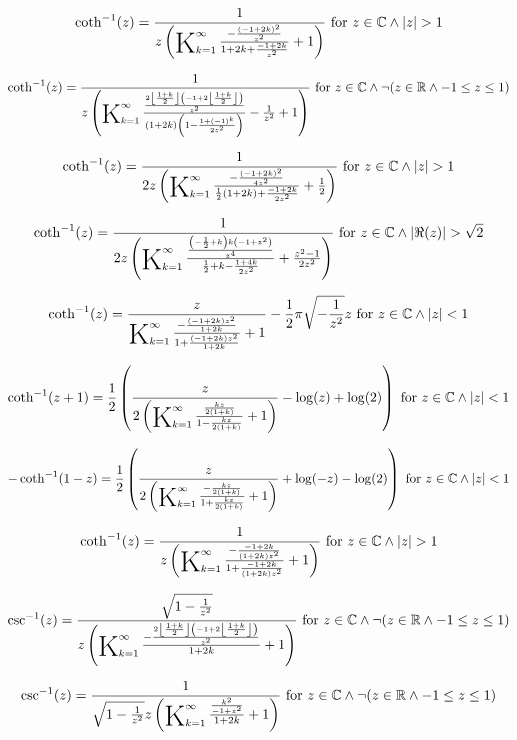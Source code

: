 \documentclass{article}
\newcommand{\bigK}{\mathop{\raisebox{-5pt}{\huge K}}}
\begin{document}
\[\coth ^{-1}(z)=\frac{1}{z \left(\bigK_{k=1}^{\infty}\frac{-\frac{(-1+2 k)^2}{z^2}}{1+2 k+\frac{-1+2 k}{z^2}}+1\right)}\text{ for }z\in \mathbb{C}\land \left| z\right| >1\] 

\[\coth ^{-1}(z)=\frac{1}{z \left(\bigK_{k=1}^{\infty}\frac{\frac{2 \left\lfloor \frac{1+k}{2}\right\rfloor  \left(-1+2 \left\lfloor \frac{1+k}{2}\right\rfloor \right)}{z^2}}{(1+2 k) \left(1-\frac{1+(-1)^k}{2 z^2}\right)}-\frac{1}{z^2}+1\right)}\text{ for }z\in \mathbb{C}\land \neg (z\in \mathbb{R}\land -1\leq z\leq 1)\] 

\[\coth ^{-1}(z)=\frac{1}{2 z \left(\bigK_{k=1}^{\infty}\frac{-\frac{(-1+2 k)^2}{4 z^2}}{\frac{1}{2} (1+2 k)+\frac{-1+2 k}{2 z^2}}+\frac{1}{2}\right)}\text{ for }z\in \mathbb{C}\land \left| z\right| >1\] 

\[\coth ^{-1}(z)=\frac{1}{2 z \left(\bigK_{k=1}^{\infty}\frac{\frac{\left(-\frac{1}{2}+k\right) k \left(-1+z^2\right)}{z^4}}{\frac{1}{2}+k-\frac{1+4 k}{2 z^2}}+\frac{z^2-1}{2 z^2}\right)}\text{ for }z\in \mathbb{C}\land \left| \Re(z)\right| >\sqrt{2}\] 

\[\coth ^{-1}(z)=\frac{z}{\bigK_{k=1}^{\infty}\frac{-\frac{(-1+2 k) z^2}{1+2 k}}{1+\frac{(-1+2 k) z^2}{1+2 k}}+1}-\frac{1}{2} \pi  \sqrt{-\frac{1}{z^2}} z\text{ for }z\in \mathbb{C}\land \left| z\right| <1\] 

\[\coth ^{-1}(z+1)=\frac{1}{2} \left(\frac{z}{2 \left(\bigK_{k=1}^{\infty}\frac{\frac{k z}{2 (1+k)}}{1-\frac{k z}{2 (1+k)}}+1\right)}-\log (z)+\log (2)\right)\text{ for }z\in \mathbb{C}\land \left| z\right| <1\] 

\[-\coth ^{-1}(1-z)=\frac{1}{2} \left(\frac{z}{2 \left(\bigK_{k=1}^{\infty}\frac{-\frac{k z}{2 (1+k)}}{1+\frac{k z}{2 (1+k)}}+1\right)}+\log (-z)-\log (2)\right)\text{ for }z\in \mathbb{C}\land \left| z\right| <1\] 

\[\coth ^{-1}(z)=\frac{1}{z \left(\bigK_{k=1}^{\infty}\frac{-\frac{-1+2 k}{(1+2 k) z^2}}{1+\frac{-1+2 k}{(1+2 k) z^2}}+1\right)}\text{ for }z\in \mathbb{C}\land \left| z\right| >1\] 

\[\csc ^{-1}(z)=\frac{\sqrt{1-\frac{1}{z^2}}}{z \left(\bigK_{k=1}^{\infty}\frac{-\frac{2 \left\lfloor \frac{1+k}{2}\right\rfloor  \left(-1+2 \left\lfloor \frac{1+k}{2}\right\rfloor \right)}{z^2}}{1+2 k}+1\right)}\text{ for }z\in \mathbb{C}\land \neg (z\in \mathbb{R}\land -1\leq z\leq 1)\] 

\[\csc ^{-1}(z)=\frac{1}{\sqrt{1-\frac{1}{z^2}} z \left(\bigK_{k=1}^{\infty}\frac{\frac{k^2}{-1+z^2}}{1+2 k}+1\right)}\text{ for }z\in \mathbb{C}\land \neg (z\in \mathbb{R}\land -1\leq z\leq 1)\] 
\end{document}

